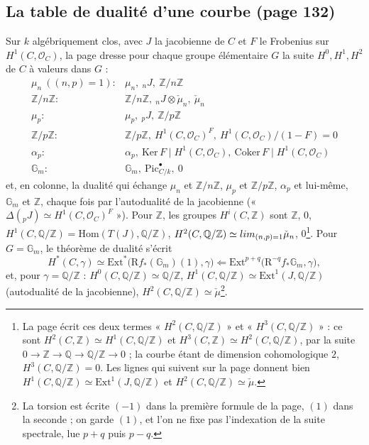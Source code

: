 \documentclass[11pt,a4paper]{article}
\begin{document}
\subsection*{La table de dualité d'une courbe (page 132)}

Sur $k$ algébriquement clos, avec $J$ la jacobienne de $C$ et $F$ le Frobenius sur
$H^1(C, \mathcal{O}_C)$, la page dresse pour chaque groupe élémentaire $G$ la suite
$H^0, H^1, H^2$ de $C$ à valeurs dans $G$ :
\[
\begin{array}{ll}
\mu_n\ ((n,p)=1) : & \mu_n,\ {}_nJ,\ \mathbb{Z}/n\mathbb{Z} \\
\mathbb{Z}/n\mathbb{Z} : & \mathbb{Z}/n\mathbb{Z},\ {}_nJ \otimes \check\mu_n,\ \check\mu_n \\
\mu_p : & \mu_p,\ {}_pJ,\ \mathbb{Z}/p\mathbb{Z} \\
\mathbb{Z}/p\mathbb{Z} : & \mathbb{Z}/p\mathbb{Z},\ H^1(C, \mathcal{O}_C)^{F},\
H^1(C, \mathcal{O}_C)/(1-F) = 0 \\
\alpha_p : & \alpha_p,\ \mathrm{Ker}\,F \mid H^1(C, \mathcal{O}_C),\
\mathrm{Coker}\,F \mid H^1(C, \mathcal{O}_C) \\
\mathbb{G}_m : & \mathbb{G}_m,\ \mathrm{Pic}^{\bullet}_{C/k},\ 0
\end{array}
\]
et, en colonne, la dualité qui échange $\mu_n$ et $\mathbb{Z}/n\mathbb{Z}$,
$\mu_p$ et $\mathbb{Z}/p\mathbb{Z}$, $\alpha_p$ et lui-même, $\mathbb{G}_m$ et
$\mathbb{Z}$, chaque fois par l'autodualité de la jacobienne (« $\Delta({}_pJ)
\simeq H^1(C, \mathcal{O}_C)^F$ »). Pour $\mathbb{Z}$, les groupes
$H^i(C, \mathbb{Z})$ sont $\mathbb{Z}$, $0$, $H^1(C, \mathbb{Q}/\mathbb{Z}) =
\mathrm{Hom}(T(J), \mathbb{Q}/\mathbb{Z})$, $H^2(C, \mathbb{Q}/\mathbb{Z}) \simeq
\varinjlim_{(n,p)=1} \check\mu_n$, $0$\footnote{La page écrit ces deux termes
« $H^2(C, \mathbb{Q}/\mathbb{Z})$ » et « $H^3(C, \mathbb{Q}/\mathbb{Z})$ » : ce sont
$H^2(C, \mathbb{Z}) \simeq H^1(C, \mathbb{Q}/\mathbb{Z})$ et $H^3(C, \mathbb{Z})
\simeq H^2(C, \mathbb{Q}/\mathbb{Z})$, par la suite $0 \to \mathbb{Z} \to
\mathbb{Q} \to \mathbb{Q}/\mathbb{Z} \to 0$ ; la courbe étant de dimension
cohomologique $2$, $H^3(C, \mathbb{Q}/\mathbb{Z}) = 0$. Les lignes qui suivent sur la
page donnent bien $H^1(C, \mathbb{Q}/\mathbb{Z}) \simeq \mathrm{Ext}^1(J,
\mathbb{Q}/\mathbb{Z})$ et $H^2(C, \mathbb{Q}/\mathbb{Z}) \simeq \check\mu$.}. Pour
$G = \mathbb{G}_m$, le théorème de dualité s'écrit
\[
H^{*}(C, \gamma) \simeq \mathrm{Ext}^{*}\bigl(\mathrm{R}f_*(\mathbb{G}_m)(1), \gamma\bigr)
\Longleftarrow \mathrm{Ext}^{p+q}\bigl(\mathrm{R}^{-q}f_*\mathbb{G}_m, \gamma\bigr),
\]
et, pour $\gamma = \mathbb{Q}/\mathbb{Z}$ : $H^0(C, \mathbb{Q}/\mathbb{Z}) \simeq
\mathbb{Q}/\mathbb{Z}$, $H^1(C, \mathbb{Q}/\mathbb{Z}) \simeq \mathrm{Ext}^1(J,
\mathbb{Q}/\mathbb{Z})$ (autodualité de la jacobienne), $H^2(C,
\mathbb{Q}/\mathbb{Z}) \simeq \check\mu$\footnote{La torsion est écrite $(-1)$ dans
la première formule de la page, $(1)$ dans la seconde ; on garde $(1)$, et l'on ne
fixe pas l'indexation de la suite spectrale, lue $p+q$ puis $p-q$.}.
\end{document}
